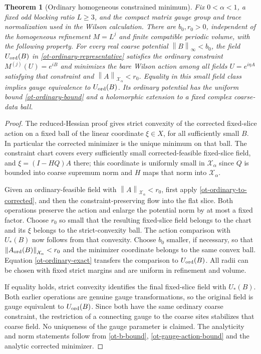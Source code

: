 \documentclass[11pt]{article}
\newtheorem{theorem}{Theorem}[section]
\theoremstyle{remark}
\newcommand{\norm}[1]{\left\|#1\right\|}
\begin{document}
\begin{theorem}[Ordinary homogeneous constrained minimum]
\label{ot-minimum}
Fix $0<\alpha<1$, a fixed odd blocking ratio $L\ge3$,
and the compact matrix gauge group and trace normalization
used in the Wilson calculation. There are $b_0,r_0>0$,
independent of the homogeneous refinement $M=L^j$ and
finite compatible periodic volume, with the following
property. For every real coarse potential
$\norm{B}_\infty<b_0$, the field $U_{\rm ord}(B)$ in
\eqref{ot-ordinary-representative} satisfies the ordinary
constraint $M^{(j)}(U)=e^{iB}$ and minimizes the bare Wilson
action among all fields $U=e^{i\eta A}$ satisfying that
constraint and $\norm{A}_{\mathcal X_\alpha}<r_0$.
Equality in this small field class implies gauge equivalence
to $U_{\rm ord}(B)$. Its ordinary potential has the uniform
bound \eqref{ot-ordinary-bound} and a holomorphic extension
to a fixed complex coarse-data ball.
\end{theorem}

\begin{proof}
The reduced-Hessian proof gives strict convexity of the
corrected fixed-slice action on a fixed ball of the linear
coordinate $\xi\in X$, for all sufficiently small $B$.
In particular the corrected minimizer is the unique minimum
on that ball. The constraint chart covers every sufficiently
small corrected-feasible fixed-slice field, and
$\xi=(I-HQ)A$ there; this coordinate is uniformly small in
$\mathcal X_\alpha$ since $Q$ is bounded into coarse
supremum norm and $H$ maps that norm into
$\mathcal X_\alpha$.

Given an ordinary-feasible field with
$\norm{A}_{\mathcal X_\alpha}<r_0$, first apply
\eqref{ot-ordinary-to-corrected}, and then the
constraint-preserving flow into the flat slice. Both
operations preserve the action and enlarge the potential
norm by at most a fixed factor. Choose $r_0$ so small that
the resulting fixed-slice field belongs to the chart and
its $\xi$ belongs to the strict-convexity ball. The action
comparison with $U_*(B)$ now follows from that convexity.
Choose $b_0$ smaller, if necessary, so that
$\norm{A_{\rm ord}(B)}_{\mathcal X_\alpha}<r_0$ and the
minimizer coordinate belongs to the same convex ball.
Equation \eqref{ot-ordinary-exact} transfers the comparison
to $U_{\rm ord}(B)$. All radii can be chosen with fixed
strict margins and are uniform in refinement and volume.

If equality holds, strict convexity identifies the final
fixed-slice field with $U_*(B)$. Both earlier operations
are genuine gauge transformations, so the original field
is gauge equivalent to $U_{\rm ord}(B)$. Since both have
the same ordinary coarse constraint, the restriction of
a connecting gauge to the coarse sites stabilizes that
coarse field. No uniqueness of the gauge parameter is
claimed. The analyticity and norm statements follow from
\eqref{ot-b-bound}, \eqref{ot-gauge-action-bound} and the
analytic corrected minimizer.
\end{proof}
\end{document}
